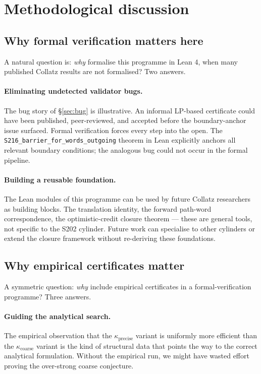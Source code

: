 \documentclass[11pt,a4paper]{article}
\theoremstyle{plain}
\theoremstyle{definition}
\begin{document}
\section{Methodological discussion}\label{app:method}

\subsection{Why formal verification matters here}

A natural question is: \emph{why} formalise this programme in
Lean 4, when many published Collatz results are not formalised?
Two answers.

\paragraph{Eliminating undetected validator bugs.}
The bug story of \S\ref{sec:bug} is illustrative. An informal
LP-based certificate could have been published, peer-reviewed,
and accepted before the boundary-anchor issue surfaced. Formal
verification forces every step into the open. The
\texttt{S216\_barrier\_for\_words\_outgoing} theorem in Lean
explicitly anchors all relevant boundary conditions; the
analogous bug could not occur in the formal pipeline.

\paragraph{Building a reusable foundation.}
The Lean modules of this programme can be used by future Collatz
researchers as building blocks. The translation identity, the
forward path-word correspondence, the optimistic-credit closure
theorem — these are general tools, not specific to the S202
cylinder. Future work can specialise to other cylinders or
extend the closure framework without re-deriving these
foundations.

\subsection{Why empirical certificates matter}

A symmetric question: \emph{why} include empirical certificates
in a formal-verification programme? Three answers.

\paragraph{Guiding the analytical search.}
The empirical observation that the $\kappa_{\mathrm{precise}}$
variant is uniformly more efficient than the $\kappa_{\mathrm{coarse}}$
variant is the kind of structural data that points the way to the
correct analytical formulation. Without the empirical run, we
might have wasted effort proving the over-strong coarse
conjecture.
\end{document}
